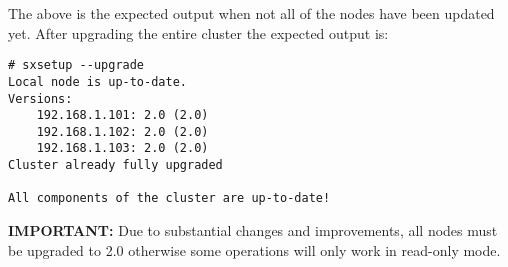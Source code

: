 The above is the expected output when not all of the nodes have been
updated yet. After upgrading the entire cluster the expected output is:
\begin{lstlisting}
# sxsetup --upgrade
Local node is up-to-date.
Versions:
	192.168.1.101: 2.0 (2.0)
	192.168.1.102: 2.0 (2.0)
	192.168.1.103: 2.0 (2.0)
Cluster already fully upgraded

All components of the cluster are up-to-date!
\end{lstlisting}
\textbf{IMPORTANT:} Due to substantial changes and improvements, all
nodes must be upgraded to 2.0 otherwise some operations will only work in
read-only mode.
